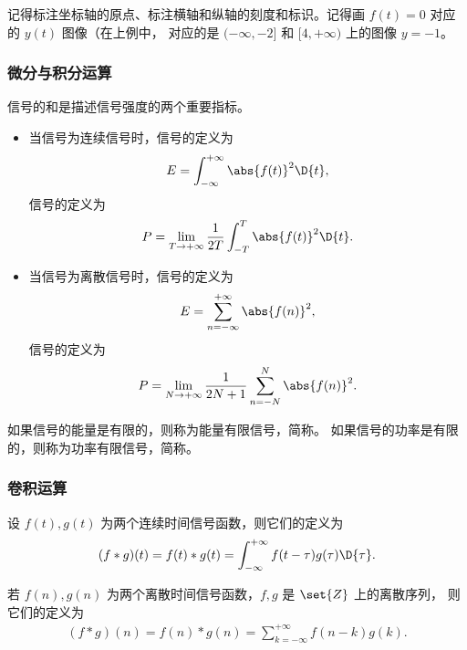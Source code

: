 \begin{note}
    记得标注坐标轴的原点、标注横轴和纵轴的刻度和标识。记得画 $f(t) = 0$ 对应的 $y(t)$ 图像（在上例中，
    对应的是 $(-\infty, -2]$ 和 $[4, +\infty)$ 上的图像 $y = -1$。
\end{note}

\subsubsection{微分与积分运算}

\begin{definition}[信号的能量与功率]
    信号的和是描述信号强度的两个重要指标。
    \begin{itemize}
        \item 当信号为连续信号时，信号的定义为
            \begin{align*}
                E = \int_{-\infty}^{+\infty}\abs{f(t)}^2\D{t},
            \end{align*}
            信号的定义为
            \begin{align*}
                P = \lim_{T \to +\infty}\frac{1}{2T}\int_{-T}^{T}\abs{f(t)}^2\D{t}.
            \end{align*}
        \item 当信号为离散信号时，信号的定义为
            \begin{align*}
                E = \sum_{n = -\infty}^{+\infty}\abs{f(n)}^2,
            \end{align*}
            信号的定义为
            \begin{align*}
                P = \lim_{N \to +\infty}\frac{1}{2N + 1}\sum_{n = -N}^{N}\abs{f(n)}^2.
            \end{align*}
    \end{itemize}
\end{definition}

\begin{definition}[能量信号与功率信号]
    如果信号的能量是有限的，则称为能量有限信号，简称。
    如果信号的功率是有限的，则称为功率有限信号，简称。
\end{definition}

\subsubsection{卷积运算}

\begin{definition}[卷积运算]
    设 $f(t), g(t)$ 为两个连续时间信号函数，则它们的定义为
    \begin{align*}
        (f * g)(t) = f(t) * g(t) = \int_{-\infty}^{+\infty}f(t - \tau)g(\tau)\D{\tau}.
    \end{align*}

    若 $f(n), g(n)$ 为两个离散时间信号函数，$f, g$ 是 $\set{Z}$ 上的离散序列，
    则它们的定义为
    \begin{align*}
        (f * g)(n) = f(n) * g(n) = \sum_{k = -\infty}^{+\infty}f(n - k)g(k).
    \end{align*}
\end{definition}

